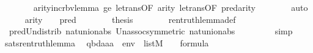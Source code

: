 \begin{isabellebody}
\ \ \ \ \ \ \isamarkupfalse%
\ arity{\isacharunderscore}{\kern0pt}incr{\isacharunderscore}{\kern0pt}bv{\isacharunderscore}{\kern0pt}lemma\ ge\ le{\isacharunderscore}{\kern0pt}trans{\isacharbrackleft}{\kern0pt}OF\ {\isacartoucheopen}arity{\isacharparenleft}{\kern0pt}{\isasymphi}{\isacharparenright}{\kern0pt}{\isasymle}{}{\isacartoucheclose}{\isacharbrackright}{\kern0pt}\ le{\isacharunderscore}{\kern0pt}trans{\isacharbrackleft}{\kern0pt}OF\ {\isacartoucheopen}pred{\isacharcircum}{\kern0pt}{}{\isacharparenleft}{\kern0pt}arity{\isacharparenleft}{\kern0pt}{\isasymphi}{\isacharparenright}{\kern0pt}{\isacharparenright}{\kern0pt}{\isasymle}{}{\isacartoucheclose}{\isacharbrackright}{\kern0pt}\isanewline
\ \ \ \ \ \ \isamarkupfalse%
\ auto\isanewline
\ \ \ \ \isamarkupfalse%
\ {\isacartoucheopen}arity{\isacharparenleft}{\kern0pt}{\isasymphi}{\isacharparenright}{\kern0pt}\ {\isasymle}\ {}{\isacartoucheclose}\ {\isacartoucheopen}{\isasymphi}{\isasymin}{\isacharunderscore}{\kern0pt}{\isacartoucheclose}\ {\isacartoucheopen}pred{\isacharcircum}{\kern0pt}{}{\isacharparenleft}{\kern0pt}{\isacharunderscore}{\kern0pt}{\isacharparenright}{\kern0pt}\ {\isasymle}\ {}{\isacartoucheclose}\isanewline
\ \ \ \ \isamarkupfalse%
\ {\isacharquery}{\kern0pt}thesis\isanewline
\ \ \ \ \ \ \isamarkupfalse%
\ ren{\isacharunderscore}{\kern0pt}truth{\isacharunderscore}{\kern0pt}lemma{\isacharunderscore}{\kern0pt}def\isanewline
\ \ \ \ \ \ \isamarkupfalse%
\ \ pred{\isacharunderscore}{\kern0pt}Un{\isacharunderscore}{\kern0pt}distrib\ nat{\isacharunderscore}{\kern0pt}union{\isacharunderscore}{\kern0pt}abs{}\ Un{\isacharunderscore}{\kern0pt}assoc{\isacharbrackleft}{\kern0pt}symmetric{\isacharbrackright}{\kern0pt}\ nat{\isacharunderscore}{\kern0pt}union{\isacharunderscore}{\kern0pt}abs{}\ \isanewline
\ \ \ \ \ \ \isamarkupfalse%
\ simp\isanewline
\ \ \isamarkupfalse%
\isanewline
{}\isamarkupfalse%
%
\endisatagproof
{\isafoldproof}%
%
\isadelimproof
\isanewline
%
\endisadelimproof
\isanewline
{}\isamarkupfalse%
\ sats{\isacharunderscore}{\kern0pt}ren{\isacharunderscore}{\kern0pt}truth{\isacharunderscore}{\kern0pt}lemma{\isacharcolon}{\kern0pt}\isanewline
\ \ {\isachardoublequoteopen}{\isacharbrackleft}{\kern0pt}q{\isacharcomma}{\kern0pt}b{\isacharcomma}{\kern0pt}d{\isacharcomma}{\kern0pt}a{}{\isacharcomma}{\kern0pt}a{}{\isacharcomma}{\kern0pt}a{}{\isacharbrackright}{\kern0pt}\ {\isacharat}{\kern0pt}\ env\ {\isasymin}\ list{\isacharparenleft}{\kern0pt}M{\isacharparenright}{\kern0pt}\ {\isasymLongrightarrow}\ {\isasymphi}\ {\isasymin}\ formula\ {\isasymLongrightarrow}\isanewline

\end{isabellebody}
